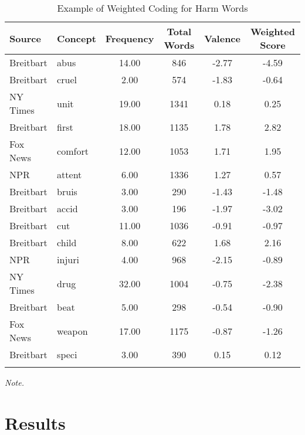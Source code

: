 \documentclass[
  man,floatsintext]{apa6}
\begin{document}
\begin{table}[h]

\begin{center}
\begin{threeparttable}

\caption{\label{tab:example-weight}Example of Weighted Coding for Harm Words}

\footnotesize{

\begin{tabular}{llcccc}
\toprule
Source & Concept & Frequency & Total Words & Valence & Weighted Score\\
\midrule
Breitbart & abus & 14.00 & 846 & -2.77 & -4.59\\
Breitbart & cruel & 2.00 & 574 & -1.83 & -0.64\\
NY Times & unit & 19.00 & 1341 & 0.18 & 0.25\\
Breitbart & first & 18.00 & 1135 & 1.78 & 2.82\\
Fox News & comfort & 12.00 & 1053 & 1.71 & 1.95\\
NPR & attent & 6.00 & 1336 & 1.27 & 0.57\\
Breitbart & bruis & 3.00 & 290 & -1.43 & -1.48\\
Breitbart & accid & 3.00 & 196 & -1.97 & -3.02\\
Breitbart & cut & 11.00 & 1036 & -0.91 & -0.97\\
Breitbart & child & 8.00 & 622 & 1.68 & 2.16\\
NPR & injuri & 4.00 & 968 & -2.15 & -0.89\\
NY Times & drug & 32.00 & 1004 & -0.75 & -2.38\\
Breitbart & beat & 5.00 & 298 & -0.54 & -0.90\\
Fox News & weapon & 17.00 & 1175 & -0.87 & -1.26\\
Breitbart & speci & 3.00 & 390 & 0.15 & 0.12\\
\bottomrule
\addlinespace
\end{tabular}

}

\begin{tablenotes}[para]
\normalsize{\textit{Note.} }
\end{tablenotes}

\end{threeparttable}
\end{center}

\end{table}

\hypertarget{results}{%
\section{Results}\label{results}}
\end{document}
